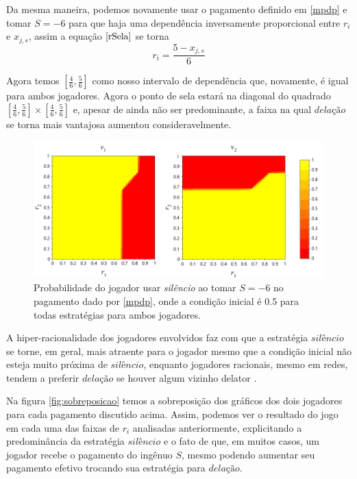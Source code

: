 Da mesma maneira, podemos novamente usar o pagamento definido em \ref{mpdp} e tomar $S=-6$ para que haja uma dependência inversamente proporcional entre $r_i$ e $x_{j,s}$, assim a equação $\eqref{rSela}$ se torna
\begin{equation}
    r_i=\frac{5-x_{j,s}}{6}
\end{equation}

Agora temos $[\frac{4}{6},\frac{5}{6}]$ como nosso intervalo de dependência que, novamente, é igual para ambos jogadores. Agora o ponto de sela estará na diagonal do quadrado $[\frac{4}{6},\frac{5}{6}]\times[\frac{4}{6},\frac{5}{6}]$ e, apesar de ainda não ser predominante, a faixa na qual $\textit{delação}$ se torna mais vantajosa aumentou consideravelmente.

\begin{figure}[h]
    \caption{Probabilidade do jogador usar \textit{silêncio} ao tomar $S=-6$ no pagamento dado por \ref{mpdp}, onde a condição inicial é 0.5 para todas estratégias para ambos jogadores.}
    \centerline{\includegraphics[scale=0.43]{./img/PD-neg-payoff-inverse-dep.png}}
    \label{fig:pd-neg-payoff-inverse-dep}
\end{figure}

A hiper-racionalidade dos jogadores envolvidos faz com que a estratégia $\textit{silêncio}$ se torne, em geral, mais atraente para o jogador mesmo que a condição inicial não esteja muito próxima de $\textit{silêncio}$, enquanto jogadores racionais, mesmo em redes, tendem a preferir $\textit{delação}$ se houver algum vizinho delator \cite{madeo2015}.

Na figura \ref{fig:sobreposicao} temos a sobreposição dos gráficos dos dois jogadores para cada pagamento discutido acima. Assim, podemos ver o resultado do jogo em cada uma das faixas de $r_i$ analisadas anteriormente, explicitando a predominância da estratégia $\textit{silêncio}$ e o fato de que, em muitos casos, um jogador recebe o pagamento do ingênuo $S$, mesmo podendo aumentar seu pagamento efetivo trocando sua estratégia para $\textit{delação}$.

